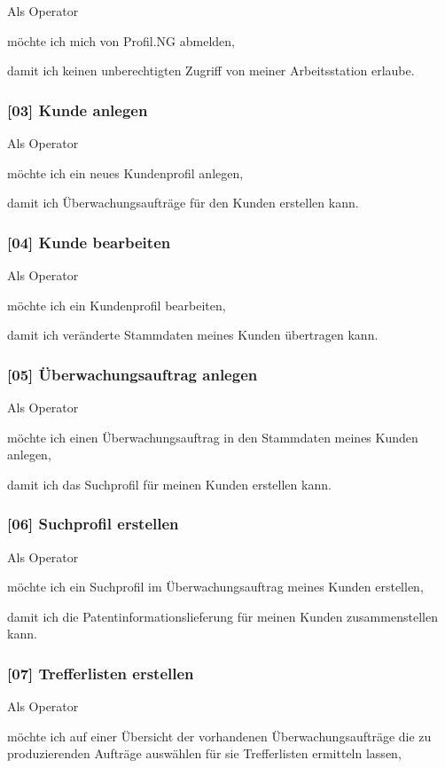 Als Operator

möchte ich mich von Profil.NG abmelden,

damit ich keinen unberechtigten Zugriff von meiner Arbeitsstation erlaube.

\subsubsection{[03] Kunde anlegen}

Als Operator

möchte ich ein neues Kundenprofil anlegen,

damit ich Überwachungsaufträge für den Kunden erstellen kann.

\subsubsection{[04] Kunde bearbeiten}

Als Operator

möchte ich ein Kundenprofil bearbeiten,

damit ich veränderte Stammdaten meines Kunden übertragen kann.

\subsubsection{[05] Überwachungsauftrag anlegen}

Als Operator

möchte ich einen Überwachungsauftrag in den Stammdaten meines Kunden anlegen,

damit ich das Suchprofil für meinen Kunden erstellen kann.

\subsubsection{[06] Suchprofil erstellen}

Als Operator

möchte ich ein Suchprofil im Überwachungsauftrag meines Kunden erstellen,

damit ich die Patentinformationslieferung für meinen Kunden zusammenstellen kann.

\subsubsection{[07] Trefferlisten erstellen}

Als Operator

möchte ich auf einer Übersicht der vorhandenen Überwachungsaufträge die zu produzierenden
Aufträge auswählen für sie Trefferlisten ermitteln lassen,


